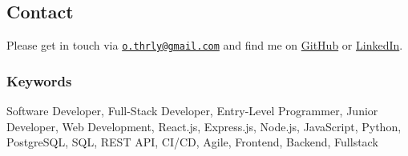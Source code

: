 \documentclass[10pt,a4paper]{article}
\begin{document}
\subsection{Contact}\label{contact}

Please get in touch via
\href{mailto:o.thrly@gmail.com}{\nolinkurl{o.thrly@gmail.com}} and find
me on \href{https://github.com/thrly}{GitHub} or
\href{https://www.linkedin.com/in/oliver-thurley}{LinkedIn}.

\subsubsection{Keywords}\label{keywords}

Software Developer, Full-Stack Developer, Entry-Level Programmer, Junior
Developer, Web Development, React.js, Express.js, Node.js, JavaScript,
Python, PostgreSQL, SQL, REST API, CI/CD, Agile, Frontend, Backend,
Fullstack
\end{document}
